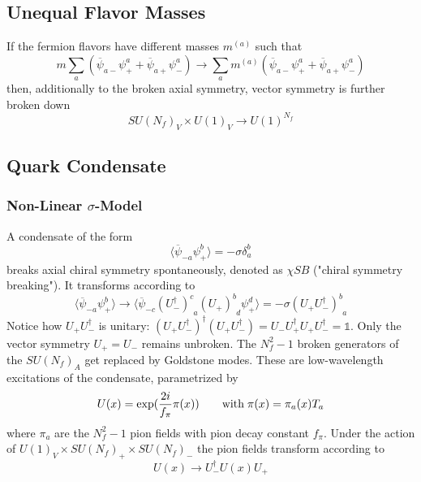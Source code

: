 \subsection{Unequal Flavor Masses}

If the fermion flavors have different masses $m^{(a)}$ such that
\begin{equation}
    m\sum_a(\overline{\psi}_{a-}\psi_+^a+\overline{\psi}_{a+}\psi_-^a)\to\sum_am^{(a)}(\overline{\psi}_{a-}\psi_+^a+\overline{\psi}_{a+}\psi_-^a)
\end{equation}
then, additionally to the broken axial symmetry, vector symmetry is further broken down
\begin{equation}
    SU(N_f)_V\times U(1)_V\to U(1)^{N_f}
\end{equation}

\subsection{Quark Condensate}

\subsubsection{Non-Linear $\sigma$-Model}

A condensate of the form
\begin{equation}
    \langle\overline{\psi}_{-a}\psi_+^b\rangle=-\sigma\delta_a^b
\end{equation}
breaks axial chiral symmetry spontaneously, denoted as $\chi SB$ ("chiral symmetry breaking"). \done{} It transforms according to
\begin{equation}
    \langle\overline{\psi}_{-a}\psi_+^b\rangle\to\langle\overline{\psi}_{-c}(U^\dagger_-)^c_{\phantom{c}a}(U_+)^b_{\phantom{b}d}\psi_+^d\rangle=-\sigma(U_+U^\dagger_-)^b_{\phantom{b}a}
\end{equation}
Notice how $U_+U^\dagger_-$ is unitary: $(U_+U^\dagger_-)^\dagger(U_+U_-^\dagger)=U_-U_+^\dagger U_+U_-^\dagger=\mathbb{1}$. Only the vector symmetry $U_+=U_-$ remains unbroken. The $N_f^2-1$ broken generators of the $SU(N_f)_A$ get replaced by Goldstone modes.  These are low-wavelength excitations of the condensate, parametrized by
\begin{equation}
    U(x)=\exp(\frac{2{i}}{f_\pi}\pi(x))\qquad\text{with}\;\pi(x)=\pi_a(x)T_a
\end{equation}
where $\pi_a$ are the $N_f^2-1$ pion fields with pion decay constant $f_\pi$. Under the action of $U(1)_V\times SU(N_f)_+\times SU(N_f)_-$ the pion fields transform according to
\begin{equation}
    U(x)\to U_-^\dagger U(x) U_+
\end{equation}

